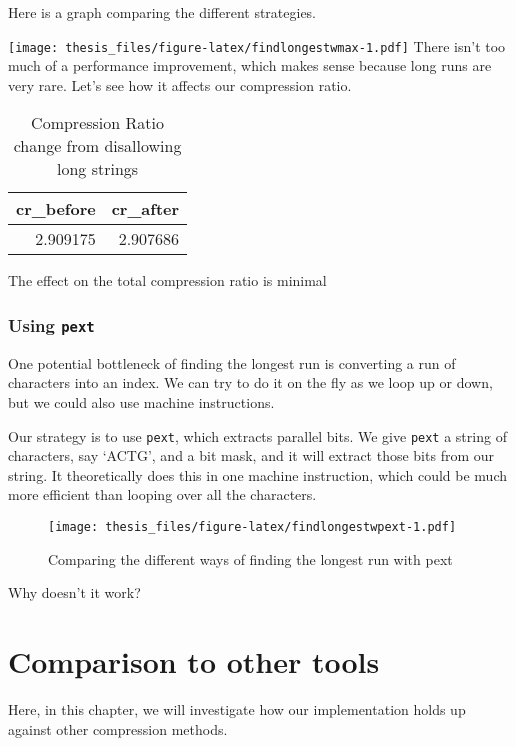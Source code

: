 \documentclass[12pt,twoside]{reedthesis}
\begin{document}
Here is a graph comparing the different strategies.

\texttt{[image: thesis\_files/figure-latex/findlongestwmax-1.pdf]}
There isn't too much of a performance improvement, which makes sense because long runs are very rare. Let's see how it affects our compression ratio.
\begin{table}

\caption{\label{tab:maxenforcedstats}Compression Ratio change from disallowing long strings}
\centering
\begin{tabular}[t]{rr}
\toprule
cr\_before & cr\_after\\
\midrule
2.909175 & 2.907686\\
\bottomrule
\end{tabular}
\end{table}
The effect on the total compression ratio is minimal

\hypertarget{using-pext}{%
\subsection{\texorpdfstring{Using \texttt{pext}}{Using pext}}\label{using-pext}}

One potential bottleneck of finding the longest run is converting a run of characters into an index. We can try to do it on the fly as we loop up or down, but we could also use machine instructions.

Our strategy is to use \texttt{pext}, which extracts parallel bits. We give \texttt{pext} a string of characters, say `ACTG', and a bit mask, and it will extract those bits from our string. It theoretically does this in one machine instruction, which could be much more efficient than looping over all the characters.
\begin{figure}
\centering
\texttt{[image: thesis\_files/figure-latex/findlongestwpext-1.pdf]}
\caption{\label{fig:findlongestwpext}Comparing the different ways of finding the longest run with pext}
\end{figure}
Why doesn't it work?

\hypertarget{comparison-to-other-tools}{%
\chapter{Comparison to other tools}\label{comparison-to-other-tools}}

Here, in this chapter, we will investigate how our implementation holds up against other compression methods.
\end{document}
